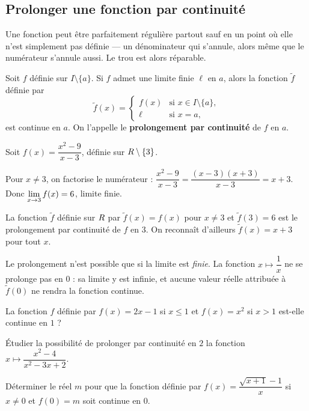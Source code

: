 \subsection{Prolonger une fonction par continuité}

Une fonction peut être parfaitement régulière partout sauf en un point où elle
n'est simplement pas définie — un dénominateur qui s'annule, alors même que le
numérateur s'annule aussi. Le trou est alors réparable.

\begin{definition}
Soit $f$ définie sur $I \setminus \{a\}$. Si $f$ admet une limite finie $\ell$
en $a$, alors la fonction $\tilde{f}$ définie par
\[
  \tilde{f}(x) =
  \begin{cases}
    f(x) & \text{si } x \in I \setminus \{a\}, \\[0.3em]
    \ell & \text{si } x = a,
  \end{cases}
\]
est continue en $a$. On l'appelle le \textbf{prolongement par continuité} de
$f$ en $a$.
\end{definition}

\begin{exemple}
Soit $f(x) = \dfrac{x^{2}-9}{x-3}$, définie sur $R \setminus \{3\}$.

Pour $x \neq 3$, on factorise le numérateur :
$\dfrac{x^{2}-9}{x-3} = \dfrac{(x-3)(x+3)}{x-3} = x+3$.
Donc $\limx{3} f(x) = 6$, limite finie.

La fonction $\tilde{f}$ définie sur $R$ par $\tilde{f}(x) = f(x)$ pour
$x \neq 3$ et $\tilde{f}(3) = 6$ est le prolongement par continuité de $f$
en $3$. On reconnaît d'ailleurs $\tilde{f}(x) = x+3$ pour tout $x$.
\end{exemple}

\begin{avertissement}
Le prolongement n'est possible que si la limite est \emph{finie}. La fonction
$x \mapsto \dfrac{1}{x}$ ne se prolonge pas en $0$ : sa limite y est infinie,
et aucune valeur réelle attribuée à $\tilde{f}(0)$ ne rendra la fonction
continue.
\end{avertissement}

\begin{entrainement}
\exo[\niveau{1}] La fonction $f$ définie par $f(x) = 2x - 1$ si $x \leq 1$ et
$f(x) = x^{2}$ si $x > 1$ est-elle continue en $1$ ?

\exo[\niveau{2}] Étudier la possibilité de prolonger par continuité en $2$ la
fonction $x \mapsto \dfrac{x^{2}-4}{x^{2}-3x+2}$.

\exo[\niveau{3}] Déterminer le réel $m$ pour que la fonction définie par
$f(x) = \dfrac{\sqrt{x+1}-1}{x}$ si $x \neq 0$ et $f(0) = m$ soit continue
en $0$.
\end{entrainement}

